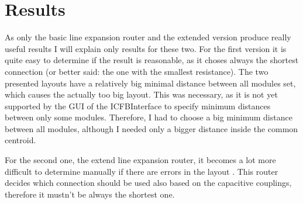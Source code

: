 \chapter{Results}
As only the basic line expansion router and the extended version produce really useful results I will explain only results for these two. For the first version  it is quite easy to determine if the result is reasonable, as it choses always the shortest connection (or better said: the one with the smallest resistance). The two presented layouts have a relatively big minimal distance between all modules set, which causes the actually too big layout. This was necessary, as it is not yet supported by the GUI of the ICFBInterface to specify minimum distances between only some modules. Therefore, I had to choose a big minimum distance between all modules, although I needed only a bigger distance inside the common centroid.

For the second one, the extend line expansion router, it becomes a lot more difficult to determine manually if there are errors in the layout . This router decides which connection should be used also based on the capacitive couplings, therefore it mustn't be always the shortest one.

